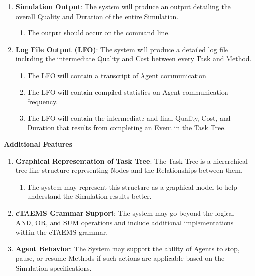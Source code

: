 \begin{enumerate}
  \item\textbf{Simulation Output}: The system will produce an output detailing the overall Quality and Duration of the entire Simulation.
  \begin{enumerate}
  \item The output should occur on the command line.
  \end{enumerate}
  
  \item\textbf{Log File Output (LFO)}: The system will produce a detailed log file including the intermediate Quality and Cost between every Task and Method.
  \begin{enumerate}
  \item The LFO will contain a transcript of Agent communication
  \item The LFO will contain compiled statistics on Agent communication frequency.
  \item The LFO will contain the intermediate and final Quality, Cost, and Duration that results from completing an Event in the Task Tree.
  \end{enumerate}

\end{enumerate}


\begin{center} \textbf{Additional Features} \end{center}

\begin{enumerate}

\item\textbf{Graphical Representation of Task Tree}:  The Task Tree is a hierarchical tree-like structure representing Nodes and the Relationships between them.
\begin{enumerate}
\item The system may represent this structure as a graphical model to help understand the Simulation results better. 
\end{enumerate}

\item\textbf{cTAEMS Grammar Support}: The system may go beyond the logical AND, OR, and SUM operations and include additional implementations within the cTAEMS grammar.

\item\textbf{Agent Behavior}: The System may support the ability of Agents to stop, pause, or resume Methods if such actions are applicable based on the Simulation specifications. 

\end{enumerate}
